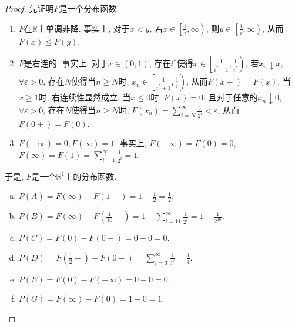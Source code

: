 \documentclass[UTF8, a4paper]{article}
\begin{document}
\begin{proof}
先证明\(F\)是一个分布函数.
\begin{enumerate}
    \item \(F\)在\(\mathbb{R}\)上单调非降. 事实上, 对于\(x < y\), 若\(x \in \left[\frac{1}{i}, \infty\right)\), 则\(y \in \left[\frac{1}{i}, \infty\right)\), 从而\(F(x) \leq F(y)\).
    \item \(F\)是右连的. 事实上, 对于\(x \in (0,1)\), 存在\(i^*\)使得\(x \in \left[\frac{1}{i^* + 1}, \frac{1}{i^*}\right)\), 若\(x_n \downarrow x\), \(\forall \varepsilon >0\), 存在\(N\)使得当\(n\geq N\)时, \(x_n \in \left[\frac{1}{i^* + 1}, \frac{1}{i}\right)\), 从而\(F(x+) = F(x)\). 当\(x \geq 1\)时, 右连续性显然成立. 当\(x \leq 0\)时, \(F(x) = 0\), 且对于任意的\(x_n \downarrow 0\), \(\forall \varepsilon >0\), 存在\(N\)使得当\(n\geq N\)时, \(F(x_n) = \sum_{i = N}^{\infty} \frac{1}{2^i} < \varepsilon\), 从而\(F(0+) = F(0)\).
    \item \(F(-\infty) = 0, F(\infty) = 1\). 事实上, \(F(-\infty) = F(0) = 0\), \(F(\infty) = F(1) = \sum_{i=1}^{\infty} \frac{1}{2^i} = 1\).
\end{enumerate}
于是, \(F\)是一个\(\mathbb{R}^1\)上的分布函数.

\begin{enumerate}[a)]
    \item \(P(A) = F(\infty) - F(1-) = 1 - \frac{1}{2} = \frac{1}{2}\).
    \item \(P(B) = F(\infty) - F\left(\frac{1}{10}-\right) = 1 - \sum_{i=11}^{\infty} \frac{1}{2^i} = 1 - \frac{1}{2^{10}}\).
    \item \(P(C) = F(0) - F(0-) = 0 - 0 = 0\).
    \item \(P(D) = F\left(\frac{1}{2}-\right) - F(0-) = \sum_{i=3}^{\infty}\frac{1}{2^i} = \frac{1}{4}\).
    \item \(P(E) = F(0) - F(-\infty) = 0 - 0 = 0\).
    \item \(P(G) = F(\infty) - F(0) = 1 - 0 = 1\).
\end{enumerate}

\end{proof}


\end{document}
